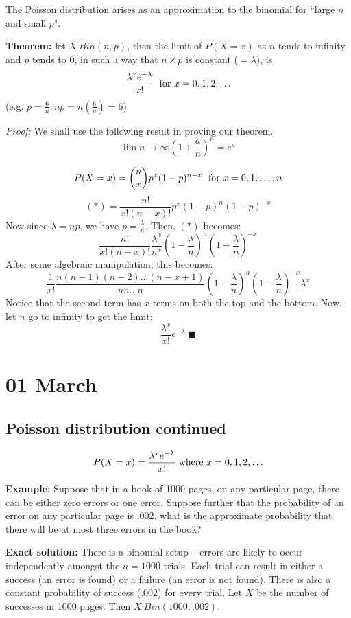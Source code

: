 \documentclass[12pt]{article}
\begin{document}
The Poisson distribution arises as an approximation to the binomial for ``large $n$ and small $p$".

\textbf{Theorem:} let $X ~ Bin(n,p)$, then the limit of $P(X=x)$ as $n$ tends to infinity and $p$ tends to 0, in such a way that $n \times p$ is constant ($ = \lambda$), is
\[
	\frac{ \lambda^x e^{- \lambda}}{x!} \; \textnormal{ for } x = 0,1,2,\ldots
\]
(e.g. $p = \frac{6}{n} : np = n(\frac{6}{n}) = 6$)

\emph{Proof:} We shall use the following result in proving our theorem.
\[
	\lim{n \to \infty} (1 + \frac{a}{n})^n = e^a
\]

\[
	P(X = x) = {n \choose x} p^x (1-p)^{n-x} \; \textnormal{ for } x = 0,1,\ldots,n
\]
\[
	(*) = \frac{n!}{x! (n-x)!} p^x (1-p)^n (1-p)^{-x}
\]
Now since $\lambda = np$, we have $p = \frac{\lambda}{n}$. Then, $(*)$ becomes:
\[
	\frac{n!}{x! (n-x)!} \frac{\lambda^x}{n^x} (1 - \frac{\lambda}{n})^n (1 - \frac{\lambda}{n})^{-x}
\]
After some algebraic manipulation, this becomes:
\[
	\frac{1}{x!} \frac{n (n-1) (n-2) \ldots (n-x+1)}{n n \ldots n} (1 - \frac{\lambda}{n})^n (1 - \frac{\lambda}{n})^{-x} \lambda^x
\]
Notice that the second term has $x$ terms on both the top and the bottom. Now, let $n$ go to infinity to get the limit:
\[
	\frac{\lambda^x}{x!} e^{- \lambda} \; \blacksquare
\]

\section{01 March}
\subsection{Poisson distribution continued}
\[
    P(X = x) = \frac{\lambda^x e^{- \lambda}}{x!} \; \textnormal{where } x = 0, 1, 2, \ldots
\]

\textbf{Example:} Suppose that in a book of 1000 pages, on any particular page, there can be either zero errors or one error. Suppose further that the probability of an error on any particular page is $.002$. what is the approximate probability that there will be at most three errors in the book?

\textbf{Exact solution:} There is a binomial setup -- errors are likely to occur independently amongst the $n = 1000$ trials. Each trial can result in either a success (an error is found) or a failure (an error is not found). There is also a constant probability of success ($.002$) for every trial. Let $X$ be the number of successes in 1000 pages. Then $X ~ Bin(1000, .002)$.
\end{document}
